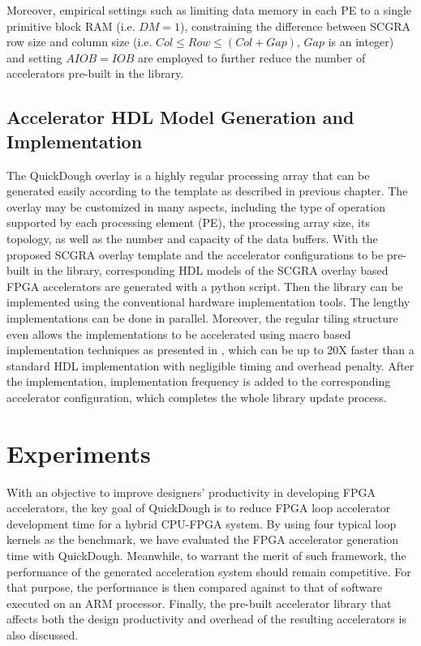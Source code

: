 Moreover, empirical settings such as limiting data memory in each PE to a single primitive block RAM
(i.e. $DM = 1$), constraining the difference between SCGRA row size and column size (i.e. $Col \leq
Row \leq (Col + Gap)$, $Gap$ is an integer) and setting $AIOB = IOB$ are employed to further reduce the number of
accelerators pre-built in the library.  

\subsection{Accelerator HDL Model Generation and Implementation}
The QuickDough overlay is a highly regular processing array that can be generated easily according to the template as described in previous chapter. The overlay may be customized in many aspects, including the type of operation supported by each processing element (PE), the processing array size, its topology, as well as the number and capacity of the data buffers. With the proposed SCGRA overlay template and the accelerator configurations to be pre-built in the library, corresponding HDL models of the SCGRA overlay based FPGA accelerators are generated with a python script. Then the library can be implemented using the conventional hardware implementation tools. The lengthy implementations can be done in parallel. Moreover, the regular tiling structure even allows the implementations to be accelerated using macro based implementation techniques as presented in \cite{yue2015rapid}, which can be up to 20X faster than a standard HDL implementation with negligible timing and overhead penalty. After the implementation, implementation frequency is added to the corresponding accelerator configuration, which completes the whole library update process.

\section{Experiments}
With an objective to improve designers' productivity in developing FPGA accelerators, the key goal of QuickDough is to reduce FPGA loop accelerator development time for a hybrid CPU-FPGA system. By using four typical loop kernels as the benchmark, we have evaluated the FPGA accelerator generation time with QuickDough. Meanwhile, to warrant the merit of such framework, the performance of the generated acceleration system should remain competitive. For that purpose, the performance is then compared against to that of software executed on an ARM processor. Finally, the pre-built accelerator library that affects both the design productivity and overhead of the resulting accelerators is also
discussed.


